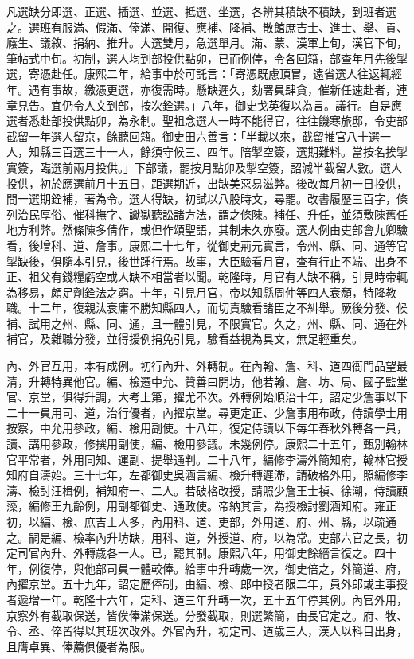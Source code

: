 \begin{pinyinscope}
凡選缺分即選、正選、插選、並選、抵選、坐選，各辨其積缺不積缺，到班者選之。選班有服滿、假滿、俸滿、開復、應補、降補、散館庶吉士、進士、舉、貢、廕生、議敘、捐納、推升。大選雙月，急選單月。滿、蒙、漢軍上旬，漢官下旬，筆帖式中旬。初制，選人均到部投供點卯，已而例停，令各回籍，部查年月先後掣選，寄憑赴任。康熙二年，給事中於可託言：「寄憑既慮頂冒，遠省選人往返輒經年。遇有事故，繳憑更選，亦復需時。懸缺遲久，劾署員肆貪，催新任速赴者，連章見告。宜仍令人文到部，按次銓選。」八年，御史戈英復以為言。議行。自是應選者悉赴部投供點卯，為永制。聖祖念選人一時不能得官，往往饑寒旅邸，令吏部截留一年選人留京，餘聽回籍。御史田六善言：「半載以來，截留推官八十選一人，知縣三百選三十一人，餘須守候三、四年。陪掣空簽，選期難料。當按名挨掣實簽，臨選前兩月投供。」下部議，罷按月點卯及掣空簽，詔減半截留人數。選人投供，初於應選前月十五日，距選期近，出缺美惡易滋弊。後改每月初一日投供，間一選期銓補，著為令。選人得缺，初試以八股時文，尋罷。改書履歷三百字，條列治民厚俗、催科撫字、讞獄聽訟諸方法，謂之條陳。補任、升任，並須敷陳舊任地方利弊。然條陳多倩作，或但作頌聖語，其制未久亦廢。選人例由吏部會九卿驗看，後增科、道、詹事。康熙二十七年，從御史荊元實言，令州、縣、同、通等官掣缺後，俱隨本引見，後世踵行焉。故事，大臣驗看月官，查有行止不端、出身不正、祖父有錢糧虧空或人缺不相當者以聞。乾隆時，月官有人缺不稱，引見時帝輒為移易，頗足劑銓法之窮。十年，引見月官，帝以知縣周仲等四人衰頹，特降教職。十二年，復親汰衰庸不勝知縣四人，而切責驗看諸臣之不糾舉。厥後分發、候補、試用之州、縣、同、通，且一體引見，不限實官。久之，州、縣、同、通在外補官，及雜職分發，並得援例捐免引見，驗看益視為具文，無足輕重矣。

內、外官互用，本有成例。初行內升、外轉制。在內翰、詹、科、道四衙門品望最清，升轉特異他官。編、檢遷中允、贊善曰開坊，他若翰、詹、坊、局、國子監堂官、京堂，俱得升調，大考上第，擢尤不次。外轉例始順治十年，詔定少詹事以下二十一員用司、道，治行優者，內擢京堂。尋更定正、少詹事用布政，侍讀學士用按察，中允用參政，編、檢用副使。十八年，復定侍讀以下每年春秋外轉各一員，讀、講用參政，修撰用副使，編、檢用參議。未幾例停。康熙二十五年，甄別翰林官平常者，外用同知、運副、提舉通判。二十八年，編修李濤外簡知府，翰林官授知府自濤始。三十七年，左都御史吳涵言編、檢升轉遲滯，請破格外用，照編修李濤、檢討汪楫例，補知府一、二人。若破格改授，請照少詹王士禎、徐潮，侍讀顧藻，編修王九齡例，用副都御史、通政使。帝納其言，為授檢討劉涵知府。雍正初，以編、檢、庶吉士人多，內用科、道、吏部，外用道、府、州、縣，以疏通之。嗣是編、檢率內升坊缺，用科、道，外授道、府，以為常。吏部六官之長，初定司官內升、外轉歲各一人。已，罷其制。康熙八年，用御史餘縉言復之。四十年，例復停，與他部司員一體較俸。給事中升轉歲一次，御史倍之，外簡道、府，內擢京堂。五十九年，詔定歷俸制，由編、檢、郎中授者限二年，員外郎或主事授者遞增一年。乾隆十六年，定科、道三年升轉一次，五十五年停其例。內官外用，京察外有截取保送，皆俟俸滿保送。分發截取，則選繁簡，由長官定之。府、牧、令、丞、倅皆得以其班次改外。外官內升，初定司、道歲三人，漢人以科目出身，且膺卓異、俸薦俱優者為限。


\end{pinyinscope}
